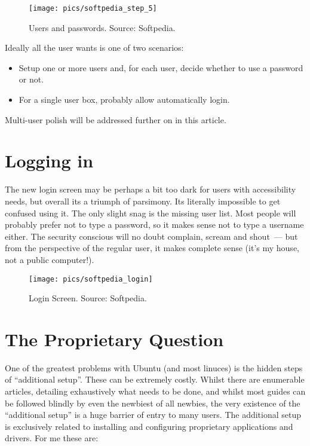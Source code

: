 \documentclass{memoir}
\begin{document}
\begin{figure}
\begin{center}
\texttt{[image: pics/softpedia\_step\_5]}
\end{center}
\caption{Users and passwords. Source: Softpedia.}
\end{figure}

Ideally all the user wants is one of two scenarios:

\begin{itemize}
\item Setup one or more users and, for each user, decide whether to
  use a password or not.
\item For a single user box, probably allow automatically login.
\end{itemize}

Multi-user polish will be addressed further on in this article.

\section{Logging in}

The new login screen may be perhaps a bit too dark for users with
accessibility needs, but overall its a triumph of parsimony. Its
literally impossible to get confused using it. The only slight snag is
the missing user list. Most people will probably prefer not to type a
password, so it makes sense not to type a username either. The
security conscious will no doubt complain, scream and shout~--- but
from the perspective of the regular user, it makes complete sense
(it's my house, not a public computer!).

\begin{figure}
\begin{center}
\texttt{[image: pics/softpedia\_login]}
\end{center}
\caption{Login Screen. Source: Softpedia.}
\end{figure}

\section{The Proprietary Question}

One of the greatest problems with Ubuntu (and most linuces) is the
hidden steps of ``additional setup''. These can be extremely
costly. Whilst there are enumerable articles, detailing exhaustively
what needs to be done, and whilst most guides can be followed blindly
by even the newbiest of all newbies, the very existence of the
``additional setup'' is a huge barrier of entry to many users. The
additional setup is exclusively related to installing and configuring
proprietary applications and drivers. For me these are:
\end{document}
